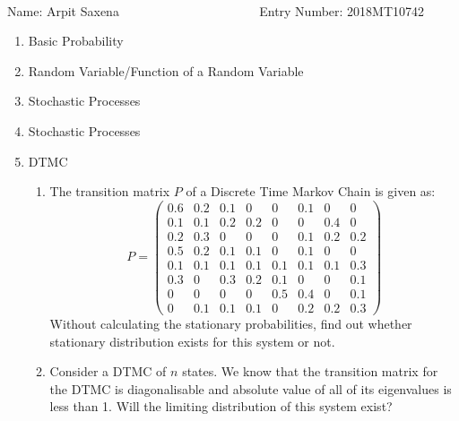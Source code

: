 \documentclass[12pt, oneside]{article}
\begin{document}
\setlength{\textheight}{8.5in}
\\





\vskip 0.5cm

\noindent Name: Arpit Saxena ~~~~~~~~~~~~~~~~~~~~~ Entry Number: 2018MT10742



\vskip 0.5cm



\begin{enumerate}
	




\item Basic Probability

\item Random Variable/Function of a Random Variable



\item Stochastic Processes

\item Stochastic Processes

\item {
    DTMC

    \begin{enumerate}
        \item {
            The transition matrix \(P\) of a Discrete Time Markov Chain is given as:
            \[P = \begin{pmatrix}
                0.6 & 0.2 & 0.1 & 0 & 0 & 0.1 & 0 & 0 \\
                0.1	& 0.1 & 0.2 & 0.2 & 0 & 0 & 0.4 & 0 \\
                0.2 & 0.3 & 0 & 0 & 0 & 0.1 & 0.2 & 0.2 \\
                0.5 & 0.2 & 0.1 & 0.1 & 0 & 0.1 & 0 & 0 \\
                0.1 & 0.1 & 0.1 & 0.1 & 0.1 & 0.1 & 0.1 & 0.3 \\
                0.3 & 0 & 0.3 & 0.2 & 0.1 & 0 & 0 & 0.1 \\
                0 & 0 & 0 & 0 & 0.5 & 0.4 & 0 & 0.1 \\
                0 & 0.1 & 0.1 & 0.1 & 0 & 0.2 & 0.2 & 0.3
            \end{pmatrix}\]
            Without calculating the stationary probabilities, find out whether stationary
            distribution exists for this system or not.
        }
        \item {
            Consider a DTMC of \(n\) states. We know that the transition matrix for the
            DTMC is diagonalisable and absolute value of all of its eigenvalues is less than 1.
            Will the limiting distribution of this system exist?

}
\end{enumerate}}
\end{enumerate}
\end{document}
